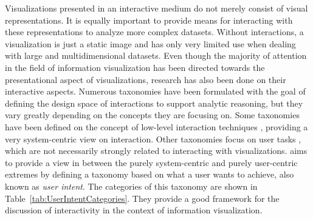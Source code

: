 Visualizations presented in an interactive medium do not merely
consist of visual representations. It is equally important to provide
means for interacting with these representations to analyze more
complex datasets. Without interactions, a visualization is just a
static image and has only very limited use when dealing with large and
multidimensional datasets. Even though the majority of attention in
the field of information visualization has been directed towards the
presentational aspect of visualizations, research has also been done
on their interactive aspects. Numerous taxonomies have been formulated
with the goal of defining the design space of interactions to support
analytic reasoning, but they vary greatly depending on the concepts
they are focusing on. Some taxonomies have been defined on the concept
of low-level interaction techniques
\parencite{TheEyesHaveIt,GrammarOfGraphics}, providing a very
system-centric view on interaction. Other taxonomies focus on user
tasks \parencite{LowLevelComponentsOfAnalyticActivity}, which are not
necessarily strongly related to interacting with visualizations.
\textcite{RoleOfInteractionInInformationVisualization} aims to provide
a view in between the purely system-centric and purely user-centric
extremes by defining a taxonomy based on what a user wants to achieve,
also known as \emph{user intent}. The categories of this taxonomy are
shown in Table~\ref{tab:UserIntentCategories}. They provide a good
framework for the discussion of interactivity in the context of
information visualization.


